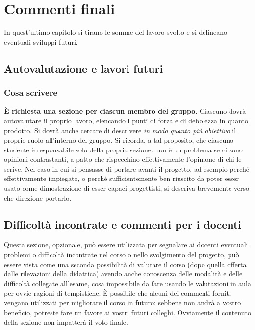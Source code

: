 \documentclass[a4paper,12pt]{report}
\begin{document}
\chapter{Commenti finali}

In quest'ultimo capitolo si tirano le somme del lavoro svolto e si delineano eventuali sviluppi futuri.

\section{Autovalutazione e lavori futuri}

\subsection*{Cosa scrivere}

\textbf{È richiesta una sezione per ciascun membro del gruppo}.
%
Ciascuno dovrà autovalutare il proprio lavoro, elencando i punti di forza e di debolezza in quanto prodotto.
Si dovrà anche cercare di descrivere \emph{in modo quanto più obiettivo} il proprio ruolo all'interno del gruppo.
Si ricorda, a tal proposito, che ciascuno studente è responsabile solo della propria sezione: non è un problema se ci sono opinioni contrastanti, a patto che rispecchino effettivamente l'opinione di chi le scrive.
Nel caso in cui si pensasse di portare avanti il progetto, ad esempio perché effettivamente impiegato, o perché sufficientemente ben riuscito da poter esser usato come dimostrazione di esser capaci progettisti, si descriva brevemente verso che direzione portarlo.

\section{Difficoltà incontrate e commenti per i docenti}

Questa sezione, opzionale, può essere utilizzata per segnalare ai docenti eventuali problemi o difficoltà incontrate nel corso o nello svolgimento del progetto, può essere vista come una seconda possibilità di valutare il corso (dopo quella offerta dalle rilevazioni della didattica) avendo anche conoscenza delle modalità e delle difficoltà collegate all'esame, cosa impossibile da fare usando le valutazioni in aula per ovvie ragioni di tempistiche.
%
È possibile che alcuni dei commenti forniti vengano utilizzati per migliorare il corso in futuro: sebbene non andrà a vostro beneficio, potreste fare un favore ai vostri futuri colleghi.
%
Ovviamente il contenuto della sezione non impatterà il voto finale.
\end{document}
